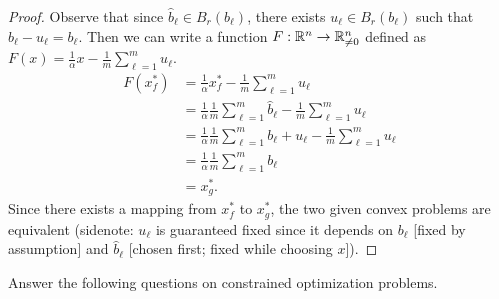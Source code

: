 \documentclass{exam}
\begin{document}
\begin{questions}
\begin{parts}
\begin{proof}
            Observe that since $\hat{b}_\ell \in B_r(b_\ell)$, there exists $u_\ell\in B_r(b_\ell)$ such that $\hat{b}_\ell - u_\ell = b_\ell$.
            Then we can write a function $F: \mathbb {R}^n \to \mathbb {R}_{\neq 0}^n$ defined as $F(x) = \frac{1}{\alpha}x - \frac{1}{m}\sum_{\ell = 1}^m u_\ell$.
            \begin{align*}
                F(x_f^*) &= \frac{1}{\alpha}x_f^* - \frac{1}{m}\sum_{\ell = 1}^m u_\ell \\
                &= \frac{1}{\alpha}\frac{1}{m}\sum_{\ell = 1}^m \hat{b}_\ell - \frac{1}{m}\sum_{\ell = 1}^m u_\ell \\
                &= \frac{1}{\alpha}\frac{1}{m}\sum_{\ell = 1}^m b_\ell + u_\ell - \frac{1}{m}\sum_{\ell = 1}^m u_\ell \\
                &= \frac{1}{\alpha}\frac{1}{m}\sum_{\ell = 1}^m b_\ell \\
                &= x_g^*.
            \end{align*}
            Since there exists a mapping from $x_f^*$ to $x_g^*$, the two given convex problems are equivalent (sidenote: $u_\ell$ is 
            guaranteed fixed since it depends on $b_\ell$ [fixed by assumption] and $\hat{b}_\ell$ [chosen first; fixed while choosing $x$]).
        \end{proof}
    \end{parts}






    \newpage
    \question Answer the following questions on constrained optimization problems.
    \begin{parts}

\end{parts}
\end{questions}
\end{document}
